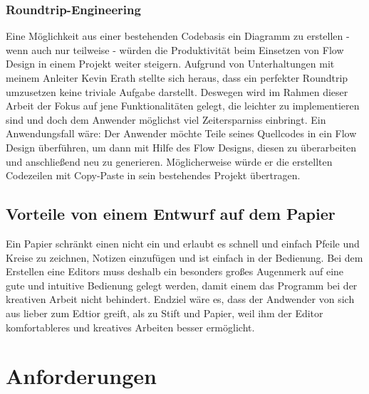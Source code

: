 \documentclass[11pt]{article}
\begin{document}
\subsubsection{Roundtrip-Engineering}
\label{sec:orgheadline5}
Eine Möglichkeit aus einer bestehenden Codebasis ein Diagramm zu erstellen -
wenn auch nur teilweise - würden die Produktivität beim Einsetzen von Flow
Design in einem Projekt weiter steigern. Aufgrund von Unterhaltungen mit meinem
Anleiter Kevin Erath stellte sich heraus, dass ein perfekter Roundtrip umzusetzen keine triviale Aufgabe
darstellt. Deswegen wird im Rahmen dieser Arbeit der Fokus auf jene Funktionalitäten
gelegt, die leichter zu implementieren sind und doch dem Anwender möglichst viel
Zeitersparniss einbringt. Ein Anwendungsfall wäre: Der Anwender möchte
Teile seines Quellcodes in ein Flow Design überführen, um dann mit Hilfe des
Flow Designs, diesen zu überarbeiten und anschließend neu zu generieren.
Möglicherweise würde er die erstellten Codezeilen mit Copy-Paste in sein
bestehendes Projekt übertragen.

\subsection{Vorteile von einem Entwurf auf dem Papier}
\label{sec:orgheadline7}
Ein Papier schränkt einen nicht ein und erlaubt es schnell und einfach Pfeile
und Kreise zu zeichnen, Notizen einzufügen und ist einfach in der Bedienung.
Bei dem Erstellen eine Editors muss deshalb ein besonders großes Augenmerk auf
eine gute und intuitive Bedienung gelegt werden, damit einem das Programm bei der kreativen Arbeit nicht
behindert. Endziel wäre es, dass der Andwender von sich aus lieber zum Edtior
greift, als zu Stift und Papier, weil ihm der Editor komfortableres und
kreatives Arbeiten besser ermöglicht.

\section{Anforderungen}
\label{sec:orgheadline21}
\end{document}
